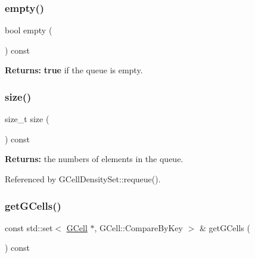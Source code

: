 \subsubsection{\texorpdfstring{empty()}{empty()}}
{\footnotesize\ttfamily bool empty (\begin{DoxyParamCaption}{ }\end{DoxyParamCaption}) const\hspace{0.3cm}{\ttfamily [inline]}}

{\bfseries Returns\+:} {\bfseries true} if the queue is empty. \mbox{\label{classKatabatic_1_1GCellDensitySet_a259cb5a711406a8c3e5d937eb9350cca}} 
\subsubsection{\texorpdfstring{size()}{size()}}
{\footnotesize\ttfamily size\+\_\+t size (\begin{DoxyParamCaption}{ }\end{DoxyParamCaption}) const\hspace{0.3cm}{\ttfamily [inline]}}

{\bfseries Returns\+:} the numbers of elements in the queue. 

Referenced by G\+Cell\+Density\+Set\+::requeue().

\mbox{\label{classKatabatic_1_1GCellDensitySet_a8bac89a45c1449ebdb28a778993cb8e5}} 
\subsubsection{\texorpdfstring{get\+G\+Cells()}{getGCells()}}
{\footnotesize\ttfamily const std\+::set$<$ \hyperlink{classKatabatic_1_1GCell}{G\+Cell} $\ast$, G\+Cell\+::\+Compare\+By\+Key $>$ \& get\+G\+Cells (\begin{DoxyParamCaption}{ }\end{DoxyParamCaption}) const\hspace{0.3cm}{\ttfamily [inline]}}

